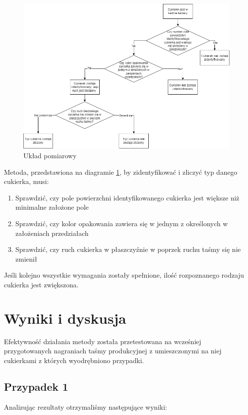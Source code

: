 \documentclass{article}
\begin{document}
\begin{figure}[H]
    \centering
    \includegraphics[width=\linewidth]{Diagram_metody.png}
    \caption{Układ pomiarowy}
    \label{fig:diagramMetody}
\end{figure}

Metoda, przedstawiona na diagramie \ref{fig:diagramMetody}, by zidentyfikować i zliczyć typ danego cukierka, musi:
\begin{enumerate}
    \item Sprawdzić, czy pole powierzchni identyfikowanego cukierka jest większe niż minimalne założone pole
    \item Sprawdzić, czy kolor opakowania zawiera się w jednym z określonych w założeniach przedziałach
    \item Sprawdzić, czy ruch cukierka w płaszczyźnie w poprzek ruchu taśmy się nie zmienił
\end{enumerate}
Jeśli kolejno wszystkie wymagania zostały spełnione, ilość rozpoznanego rodzaju cukierka jest zwiększona.

\section{Wyniki i dyskusja}
\label{Wyniki i dyskusja}
Efektywność działania metody została przetestowana na wcześniej przygotowanych nagraniach taśmy produkcyjnej z umieszczonymi na niej cukierkami z których wyodrębniono przypadki.
\subsection{Przypadek 1}
Analizując rezultaty otrzymaliśmy następujące wyniki:
\end{document}
